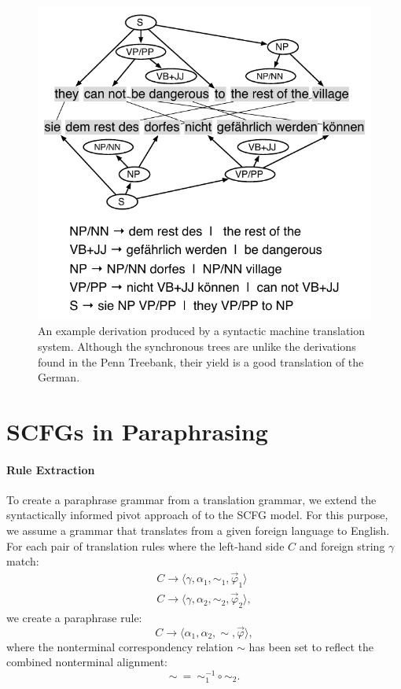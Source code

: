 \documentclass[11pt]{article}
\begin{document}
\begin{figure}[t]
\begin{center}
\includegraphics[width=0.99\linewidth]{figures/example_translation.pdf}
\end{center}
\caption{An example derivation produced by a syntactic machine
  translation system.  Although the synchronous trees are unlike the
  derivations found in the Penn Treebank, their yield is a good
  translation of the German.}
\label{example_translation}
\end{figure}


\section{SCFGs in Paraphrasing} \label{acquisition}


\paragraph{Rule Extraction}

To create a paraphrase grammar from a translation grammar, we extend
the syntactically informed pivot approach of
 to the SCFG model. For this purpose, we
assume a grammar that translates from a given foreign language to
English. For each pair of translation rules where the left-hand side
$C$ and foreign string $\gamma$ match:
\begin{eqnarray*}
  C \rightarrow \langle \gamma, \alpha_1, \sim_1, \vec{\varphi}_1 \rangle \\
  C \rightarrow \langle \gamma, \alpha_2, \sim_2, \vec{\varphi}_2 \rangle ,
\end{eqnarray*}
we create a paraphrase rule:
\begin{equation*}
C \rightarrow \langle \alpha_1, \alpha_2, \sim, \vec{\varphi} \rangle ,
\end{equation*}
where the nonterminal correspondency relation $\sim$ has been set to
reflect the combined nonterminal alignment:
\begin{equation*}
\sim ~ = ~ \sim_1^{-1} \circ \sim_2 .
\end{equation*}
\end{document}
